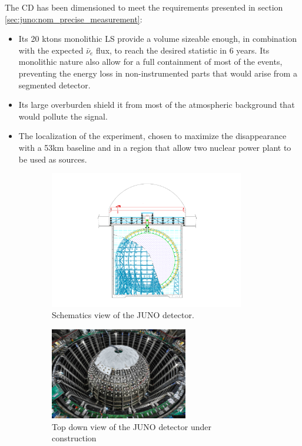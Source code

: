 The CD has been dimensioned to meet the requirements presented in section \ref{sec:juno:nom_precise_measurement}:
\begin{itemize}
  \item Its 20 ktons monolithic LS provide a volume sizeable enough, in combination with the expected $\bar{\nu}_e$ flux, to reach the desired statistic in 6 years. Its monolithic nature also allow for a full containment of most of the events, preventing the energy loss in non-instrumented parts that would arise from a segmented detector.
  \item Its large overburden shield it from most of the atmospheric background that would pollute the signal.
  \item The localization of the experiment, chosen to maximize the disappearance with a 53km baseline and in a region that allow two nuclear power plant to be used as sources.
\end{itemize}

\begin{figure}[ht]
  \centering
  \begin{subfigure}[b]{0.45\textwidth}
    \centering
    \includegraphics[height=6cm]{images/juno/drawing_schema.png}
    \caption{Schematics view of the JUNO detector.}
    \label{fig:juno:juno-schema}
  \end{subfigure}
  \hfill
  \begin{subfigure}[b]{0.45\textwidth}
    \centering
    \includegraphics[height=4cm]{images/juno/top_down_view.jpg}
    \caption{Top down view of the JUNO detector under construction}
  \end{subfigure}
  \caption{}
\end{figure}

